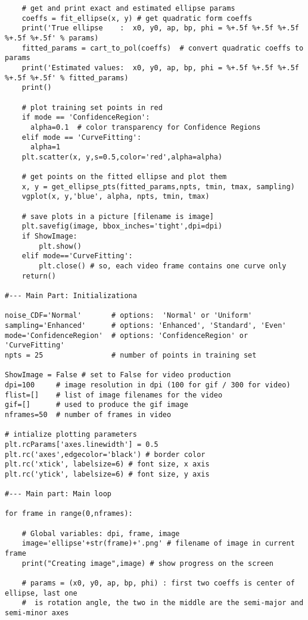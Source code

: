 \documentclass[oneside,10pt]{book}
\begin{document}
\begin{lstlisting}
    # get and print exact and estimated ellipse params
    coeffs = fit_ellipse(x, y) # get quadratic form coeffs
    print('True ellipse    :  x0, y0, ap, bp, phi = %+.5f %+.5f %+.5f %+.5f %+.5f' % params)
    fitted_params = cart_to_pol(coeffs)  # convert quadratic coeffs to params
    print('Estimated values:  x0, y0, ap, bp, phi = %+.5f %+.5f %+.5f %+.5f %+.5f' % fitted_params)
    print()

    # plot training set points in red
    if mode == 'ConfidenceRegion':
      alpha=0.1  # color transparency for Confidence Regions
    elif mode == 'CurveFitting':
      alpha=1
    plt.scatter(x, y,s=0.5,color='red',alpha=alpha)

    # get points on the fitted ellipse and plot them
    x, y = get_ellipse_pts(fitted_params,npts, tmin, tmax, sampling)
    vgplot(x, y,'blue', alpha, npts, tmin, tmax)

    # save plots in a picture [filename is image]
    plt.savefig(image, bbox_inches='tight',dpi=dpi)
    if ShowImage:
        plt.show()
    elif mode=='CurveFitting':
        plt.close() # so, each video frame contains one curve only
    return()

#--- Main Part: Initializationa

noise_CDF='Normal'       # options:  'Normal' or 'Uniform'
sampling='Enhanced'      # options: 'Enhanced', 'Standard', 'Even'
mode='ConfidenceRegion'  # options: 'ConfidenceRegion' or 'CurveFitting'
npts = 25                # number of points in training set

ShowImage = False # set to False for video production
dpi=100     # image resolution in dpi (100 for gif / 300 for video)
flist=[]    # list of image filenames for the video
gif=[]      # used to produce the gif image
nframes=50  # number of frames in video

# intialize plotting parameters
plt.rcParams['axes.linewidth'] = 0.5
plt.rc('axes',edgecolor='black') # border color
plt.rc('xtick', labelsize=6) # font size, x axis
plt.rc('ytick', labelsize=6) # font size, y axis

#--- Main part: Main loop

for frame in range(0,nframes):

    # Global variables: dpi, frame, image
    image='ellipse'+str(frame)+'.png' # filename of image in current frame
    print("Creating image",image) # show progress on the screen

    # params = (x0, y0, ap, bp, phi) : first two coeffs is center of ellipse, last one
    #  is rotation angle, the two in the middle are the semi-major and semi-minor axes


\end{lstlisting}
\end{document}
